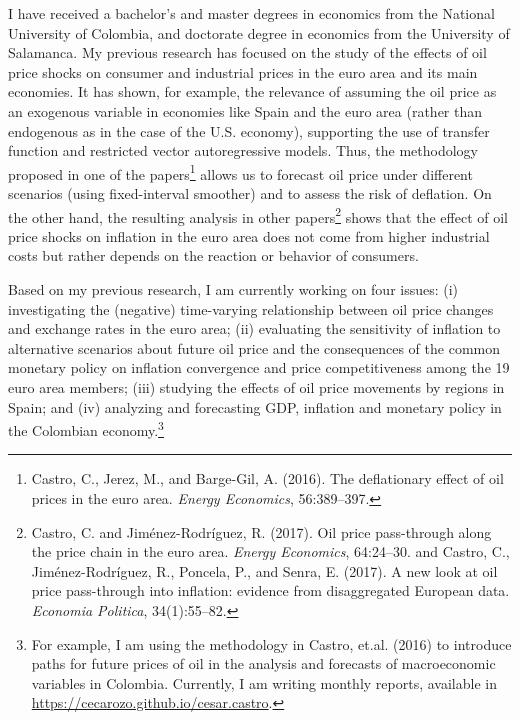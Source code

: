 \documentclass{letter}\usepackage[]{graphicx}\usepackage[]{color}
\begin{document}

I have received a bachelor's and master degrees in economics from the National University of Colombia, and doctorate degree in economics from the University of Salamanca. My previous research has focused on the study of the effects of oil price shocks on consumer and industrial prices in the euro area and its main economies. It has shown, for example, the relevance of assuming the oil price as an exogenous variable in economies like Spain and the euro area (rather than endogenous as in the case of the U.S. economy), supporting the use of transfer function and restricted vector autoregressive models. Thus, the methodology proposed in one of the papers\footnote{Castro, C., Jerez, M., and Barge-Gil, A. (2016). The deflationary effect of oil prices in the euro area. \emph{Energy Economics}, 56:389–397.} allows us to forecast oil price under different scenarios (using fixed-interval smoother) and to assess the risk of deflation. On the other hand, the resulting analysis in other papers\footnote{Castro, C. and Jiménez-Rodríguez, R. (2017). Oil price pass-through along the price chain in the euro area. \emph{Energy Economics}, 64:24–30. and Castro, C., Jiménez-Rodríguez, R., Poncela, P., and Senra, E. (2017). A new look at oil price pass-through into inflation: evidence from disaggregated European data. \emph{Economia Politica}, 34(1):55–82.} shows that the effect of oil price shocks on inflation in the euro area does not come from higher industrial costs but rather depends on the reaction or behavior of consumers.

Based on my previous research, I am currently working on four issues: (i) investigating the (negative) time-varying relationship between oil price changes and exchange rates in the euro area; (ii) evaluating the sensitivity of inflation to alternative scenarios about future oil price and the consequences of the common monetary policy on inflation convergence and price competitiveness among the 19 euro area members; (iii) studying the effects of oil price movements by regions in Spain; and (iv) analyzing and forecasting GDP, inflation and monetary policy in the Colombian economy.\footnote{For example, I am using the methodology in Castro, et.al. (2016) to introduce paths for future prices of oil in the analysis and forecasts of macroeconomic variables in Colombia. Currently, I am writing monthly reports, available in \href{https://cecarozo.github.io/cesar.castro}{https://cecarozo.github.io/cesar.castro}.} 
\end{document}

